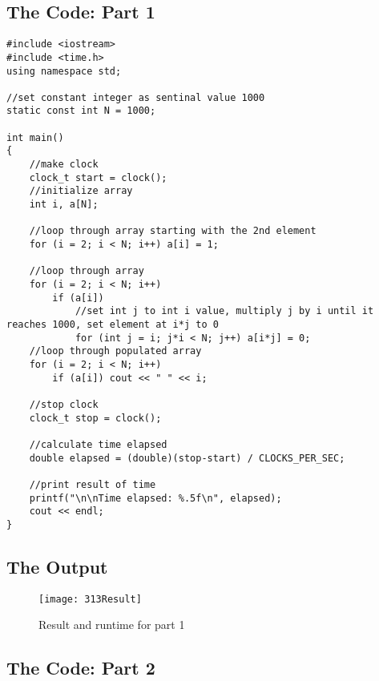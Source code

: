 \documentclass[11pt]{article}
\begin{document}
\subsection*{The Code: Part 1}
\begin{lstlisting}
#include <iostream>
#include <time.h>
using namespace std;

//set constant integer as sentinal value 1000
static const int N = 1000;

int main()
{
    //make clock
    clock_t start = clock();
    //initialize array
    int i, a[N];

    //loop through array starting with the 2nd element
    for (i = 2; i < N; i++) a[i] = 1;

    //loop through array
    for (i = 2; i < N; i++)
        if (a[i])
            //set int j to int i value, multiply j by i until it reaches 1000, set element at i*j to 0
            for (int j = i; j*i < N; j++) a[i*j] = 0;
    //loop through populated array
    for (i = 2; i < N; i++)
        if (a[i]) cout << " " << i;

    //stop clock
    clock_t stop = clock();

    //calculate time elapsed
    double elapsed = (double)(stop-start) / CLOCKS_PER_SEC;

    //print result of time
    printf("\n\nTime elapsed: %.5f\n", elapsed);
    cout << endl;
}
\end{lstlisting}

\subsection*{The Output}
\begin{figure}[h]
    \centering
    \texttt{[image: 313Result]}
    \caption{Result and runtime for part 1}
    \label{fig:my_label}
\end{figure}

\subsection*{The Code: Part 2}
\end{document}
